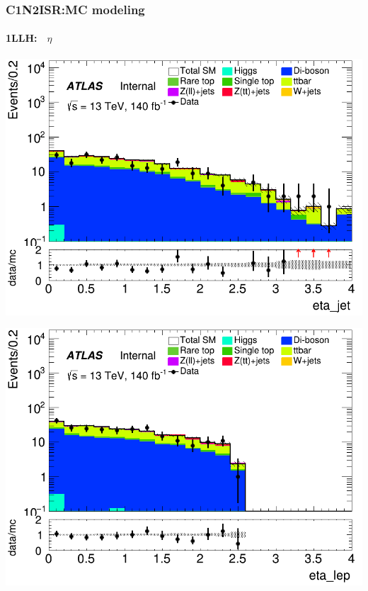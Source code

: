 \documentclass[usenames,dvipsnames]{beamer}
\begin{document}
\begin{frame}
\frametitle{C1N2ISR:MC modeling}
\framesubtitle{1LLH:$\quad\eta$}
    \begin{minipage}{0.32\textwidth}
        \centering
        \includegraphics[width=\textwidth]{graphics/LLH_met/LLH_met_eta_jet.png}
    \end{minipage}
    \hfill
    \begin{minipage}{0.32\textwidth}
        \centering
        \includegraphics[width=\textwidth]{graphics/LLH_met/LLH_met_eta_lep.png}
    \end{minipage}
    \hfill
    \begin{minipage}{0.32\textwidth}
        \centering

\end{minipage}
\end{frame}
\end{document}
